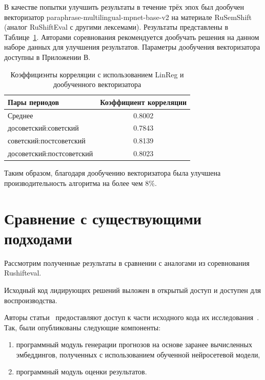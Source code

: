\documentclass[LI,VKR]{HSEUniversity}
\begin{document}
В качестве попытки улучшить результаты в течение трёх эпох
был дообучен векторизатор paraphrase-multilingual-mpnet-base-v2
на материале RuSemShift (аналог RuShiftEval с другими лексемами).
Результаты представлены в Таблице~\ref{tab:Rushifteval 2}.
Авторами соревнования рекомендуется дообучать решения на данном наборе данных для улучшения результатов.
Параметры дообучения векторизатора доступны в Приложении В.

\begin{table}[H]
\centering
\caption{Коэффициэнты корреляции с использованием LinReg и дообученного векторизатора}
\label{tab:Rushifteval 2}
\begin{tabular}{|l|c|}
\hline
\textbf{Пары периодов}                  & \textbf{Коэффициент корреляции} \\
\hline
Среднее            & 0.8002                  \\
\hline
досоветский:советский           & 0.7843                  \\
\hline
советский:постсоветский          & 0.8139                  \\
\hline
досоветский:постсоветский      & 0.8023                  \\
\hline
\end{tabular}
\end{table}

Таким образом, благодаря дообучению векторизатора была улучшена производительность алгоритма
на более чем 8\%.

\section{Сравнение с существующими подходами}

Рассмотрим полученные результаты в сравнении с аналогами из соревнования Rushifteval.

Исходный код лидирующих решений выложен в открытый доступ и доступен для воспроизводства.

Авторы статьи~\cite{GlossReader} предоставляют доступ к части исходного кода
их исследования~.
Так, были опубликованы следующие компоненты:
\begin{enumerate}
    \item программный модуль генерации прогнозов на основе заранее вычисленных эмбеддингов,
полученных с использованием обученной нейросетевой модели,
    \item программный модуль оценки результатов.
\end{enumerate}
\end{document}

